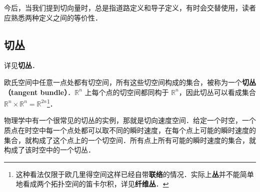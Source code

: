 今后，当我们提到切向量时，总是指道路定义和导子定义，有时会交替使用，读者应熟悉两种定义之间的等价性．

\subsection{切丛}
详见\textbf{切丛}．

欧氏空间中任意一点处都有切空间，所有这些切空间构成的集合，被称为一个\textbf{切丛（tangent bundle）}．$\mathbb{R}^n$ 上每个点的切空间都同构于 $\mathbb{R}^n$，因此切丛可以看成集合 $\mathbb{R}^n\times\mathbb{R}^n=\mathbb{R}^{2n}$\footnote{这种看法仅限于欧几里得空间这样已经自带\textbf{联络}的情况．实际上\textbf{丛}并不能简单地看成两个拓扑空间的笛卡尔积，详见\textbf{纤维丛}．}．

物理学中有一个很常见的切丛的实例，那就是切向速度空间．给定一个时空，一个质点在时空中每一个点处都可以取不同的瞬时速度，在每个点上可能的瞬时速度的集合，就构成了这个点上的一个切空间．所有点上所有可能的瞬时速度的集合，就构成了该时空中的一个切丛．









